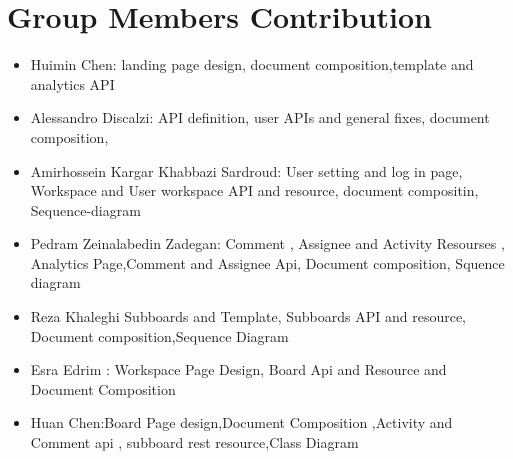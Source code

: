 \section{Group Members Contribution}

\begin{itemize}
    \item Huimin Chen: landing page design, document composition,template and analytics API
    \item Alessandro Discalzi: API definition, user APIs and general fixes,  document composition,
    \item Amirhossein Kargar Khabbazi Sardroud: User setting and log in page, Workspace and User workspace API and resource, document compositin, Sequence-diagram
    \item Pedram Zeinalabedin Zadegan: Comment , Assignee and Activity Resourses , Analytics Page,Comment and Assignee Api, Document composition, Squence diagram
    \item Reza Khaleghi  Subboards and Template, Subboards API and resource, Document composition,Sequence Diagram
    \item Esra Edrim : Workspace Page Design, Board Api and Resource and Document Composition 
    \item Huan Chen:Board Page design,Document Composition ,Activity and Comment api , subboard rest resource,Class Diagram 
\end{itemize}